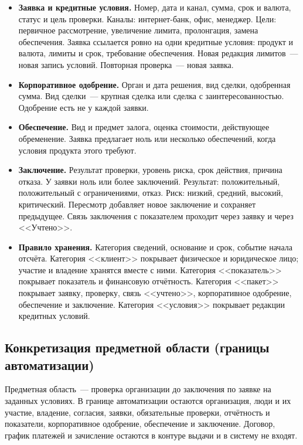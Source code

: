 \begin{itemize}
\item \textbf{Заявка и кредитные условия.} Номер, дата и канал, сумма, срок и валюта, статус и цель проверки. Каналы: интернет-банк, офис, менеджер. Цели: первичное рассмотрение, увеличение лимита, пролонгация, замена обеспечения. Заявка ссылается ровно на одни кредитные условия: продукт и валюта, лимиты и срок, требование обеспечения. Новая редакция лимитов~--- новая запись условий. Повторная проверка~--- новая заявка.
\item \textbf{Корпоративное одобрение.} Орган и дата решения, вид сделки, одобренная сумма. Вид сделки~--- крупная сделка или сделка с заинтересованностью. Одобрение есть не у каждой заявки.
\item \textbf{Обеспечение.} Вид и предмет залога, оценка стоимости, действующее обременение. Заявка предлагает ноль или несколько обеспечений, когда условия продукта этого требуют.
\item \textbf{Заключение.} Результат проверки, уровень риска, срок действия, причина отказа. У заявки ноль или более заключений. Результат: положительный, положительный с ограничениями, отказ. Риск: низкий, средний, высокий, критический. Пересмотр добавляет новое заключение и сохраняет предыдущее. Связь заключения с показателем проходит через заявку и через <<Учтено>>.
\item \textbf{Правило хранения.} Категория сведений, основание и срок, событие начала отсчёта. Категория <<клиент>> покрывает физическое и юридическое лицо; участие и владение хранятся вместе с ними. Категория <<показатель>> покрывает показатель и финансовую отчётность. Категория <<пакет>> покрывает заявку, проверку, связь <<учтено>>, корпоративное одобрение, обеспечение и заключение. Категория <<условия>> покрывает редакции кредитных условий.
\end{itemize}

\subsection{Конкретизация предметной области (границы автоматизации)}

Предметная область~--- проверка организации до заключения по заявке на заданных условиях. В границе автоматизации остаются организация, люди и их участие, владение, согласия, заявки, обязательные проверки, отчётность и показатели, корпоративное одобрение, обеспечение и заключение. Договор, график платежей и зачисление остаются в контуре выдачи и в систему не входят.

